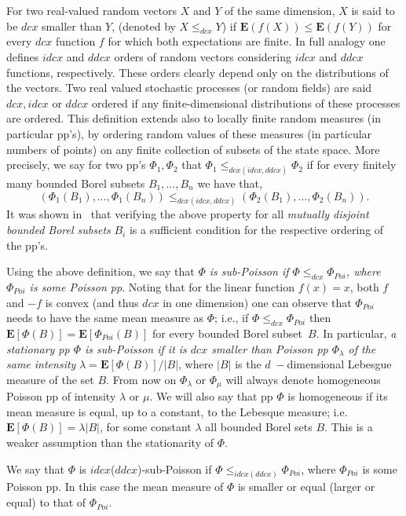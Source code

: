 \documentclass[conference]{IEEEtran}
\begin{document}
For two  real-valued random vectors $X$ and $Y$  of the
same dimension,   $X$ is said to be $dcx$  smaller than $Y$,
(denoted by $X\le_{dcx}Y$) 
if ${{\mathbf E}}(f(X)) \leq {{\mathbf E}}(f(Y))$ for every $dcx$ function $f$
for which both expectations are finite. 
In full analogy one defines $idcx$ and $ddcx$ orders of random vectors
considering $idcx$ and $ddcx$ functions, respectively.
These orders clearly depend only on the distributions of the vectors. 
Two real valued stochastic processes (or random fields) 
are said $dcx, idcx$ or $ddcx$ ordered 
if any finite-dimensional distributions of these processes are ordered.
This definition extends also to locally finite random measures (in particular
pp's), by ordering random values of these measures (in particular
numbers of points) on any finite collection of subsets of the state space. More precisely, we say for two pp's $\Phi_1,\Phi_2$ that $\Phi_1 \leq_{dcx(idcx,ddcx)} \Phi_2$ if for every finitely many bounded Borel subsets $B_1,\ldots,B_n$ we have that,
$$(\Phi_1(B_1),\ldots,\Phi_1(B_n)) \leq_{dcx(idcx,ddcx)} (\Phi_2(B_1),\ldots,\Phi_2(B_n))  .$$
It was shown in~\cite{snorder} that  verifying  the above
property for all  {\em mutually disjoint bounded Borel subsets} $B_i$ is 
a sufficient condition for the respective ordering of the pp's.

Using the above definition, we say that  {\em $\Phi$ is sub-Poisson if $\Phi
\leq_{dcx} \Phi_{Poi}$, where $\Phi_{Poi}$ is some Poisson pp}.
Noting that for the  linear function $f(x)=x$, both $f$ and
$-f$ is convex (and thus $dcx$ in one dimension) 
one can observe that $\Phi_{Poi}$ needs to have the same mean measure 
as $\Phi$; i.e., if  $\Phi
\leq_{dcx} \Phi_{Poi}$  then ${{\mathbf E}}[\Phi(B)]={{\mathbf E}}[\Phi_{Poi}(B)]$ for every
bounded Borel subset~$B$. In particular, {\em a stationary pp $\Phi$ is
sub-Poisson  if it is $dcx$ smaller than Poisson pp $\Phi_\lambda$ 
of the same intensity} $\lambda={{\mathbf E}}[\Phi(B)]/|B|$, where $|B|$ is the
$d\;-$dimensional Lebesgue measure of the set $B$.   
{From} now on $\Phi_\lambda$ or $\Phi_\mu$ will always denote
homogeneous Poisson pp of intensity $\lambda$ or $\mu$.
We will also say that pp $\Phi$ is homogeneous if its mean measure is 
equal, up to a constant, to the Lebesque measure; i.e. 
${{\mathbf E}}[\Phi(B)]=\lambda |B|$, for some constant $\lambda$
all bounded Borel sets $B$. This is a
weaker assumption than the stationarity of $\Phi$.
 
We say that $\Phi$ is $idcx$($ddcx$)-sub-Poisson 
if $\Phi\leq_{idcx(ddcx)}\Phi_{Poi}$,  where $\Phi_{Poi}$ is some
Poisson pp. In this case the mean measure of $\Phi$ is smaller or
equal (larger or equal)  to that of $\Phi_{Poi}$.
\end{document}
